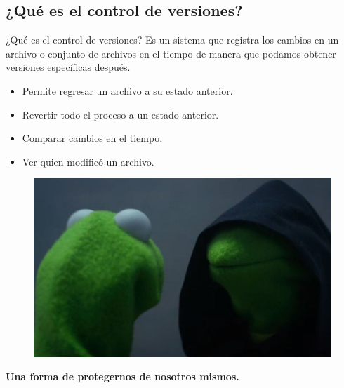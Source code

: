 \documentclass{beamer}
\begin{document}
\subsection{¿Qué es el control de versiones?}
\begin{frame}{¿Qué es el control de versiones?}
 \footnotesize
 Es un sistema que registra los cambios en un archivo o conjunto de archivos en el tiempo de manera que podamos obtener     versiones específicas después.  \\ 

 \begin{itemize}
  \item Permite regresar un archivo a su estado anterior. 
  \item Revertir todo el proceso a un estado anterior.
  \item Comparar cambios en el tiempo.
  \item Ver quien modificó un archivo.
 \end{itemize}
 \begin{figure}
  \centering
  \includegraphics[scale=0.2]{Imagenes/kermit}
 \end{figure}
\centering
\textbf{Una forma de protegernos de nosotros mismos.}
\end{frame}
\end{document}
